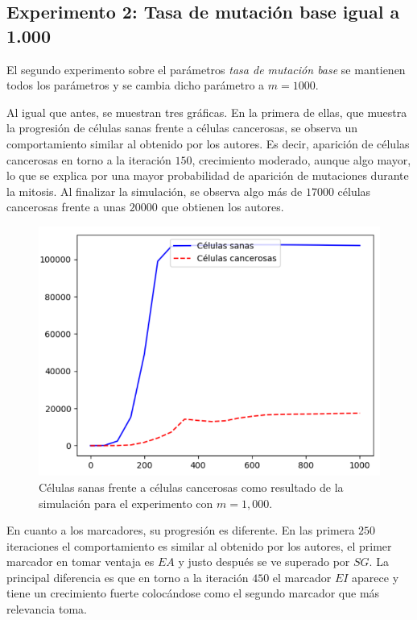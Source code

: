 \subsection{Experimento 2: Tasa de mutación base igual a 1.000}

El segundo experimento sobre el parámetros \textit{tasa de mutación base} se
mantienen todos los parámetros y se cambia dicho parámetro a $m=1000$.

Al igual que antes, se muestran tres gráficas. En la primera de ellas, que muestra la progresión de
células sanas frente a células cancerosas, se observa un comportamiento similar al obtenido
por los autores. Es decir, aparición de células cancerosas en torno a la iteración $150$,
crecimiento moderado, aunque algo mayor, lo que se explica por una mayor
probabilidad de aparición de mutaciones durante la mitosis. Al finalizar la simulación, se
observa algo más de $17000$ células cancerosas frente a unas $20000$ que obtienen los autores.

\begin{figure}[h]
\centering
\includegraphics[scale=0.8]{figures/experiments/exp2/healthvscarcino}
\caption{Células sanas frente a células cancerosas como resultado de la simulación para el experimento con $m = 1,000$.}
\end{figure}

En cuanto a los marcadores, su progresión es diferente. En las primera $250$ iteraciones
el comportamiento es similar al obtenido por los autores, el primer marcador en tomar ventaja es
$EA$ y justo después se ve superado por $SG$. La principal diferencia es que en torno a la iteración $450$
el marcador $EI$ aparece y tiene un crecimiento fuerte colocándose como el segundo marcador que más relevancia
toma.

